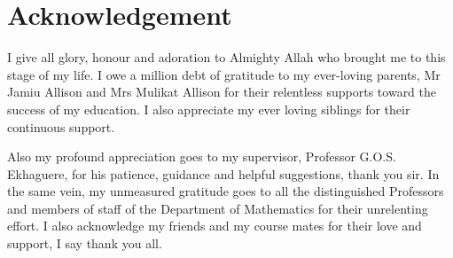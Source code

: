 \documentclass[12pt]{report}
\numberwithin{equation}{section}
\begin{document}
\newpage 
{}
\section*{\centering Acknowledgement}


I give all glory, honour and adoration to Almighty Allah who brought me to this stage of my life. I owe a million debt of gratitude to my ever-loving parents, Mr Jamiu Allison and Mrs Mulikat Allison for their relentless supports toward the success of my education. I also appreciate my ever loving siblings for their continuous support.

Also my profound appreciation goes to my supervisor, Professor G.O.S. Ekhaguere, for his patience, guidance and helpful suggestions, thank you sir. In the same vein, my unmeasured gratitude goes to all the distinguished Professors and members of staff of the Department of Mathematics for their unrelenting effort. I also acknowledge my friends and my course mates for their love and support, I say thank you all.





\newpage
{}
\end{document}

